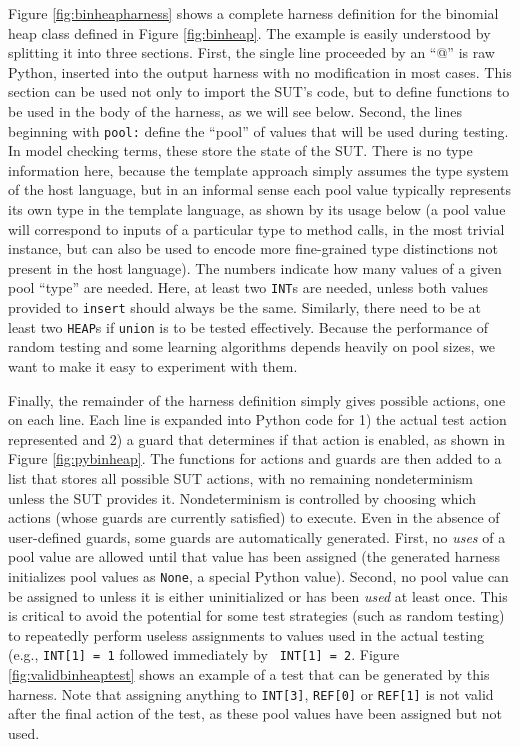 Figure \ref{fig:binheapharness} shows a complete harness definition
for the binomial heap class defined in Figure \ref{fig:binheap}.  The
example is easily understood by splitting it into three sections.
First, the single line proceeded by an ``@'' is raw Python, inserted
into the output harness with no modification in most cases.  This
section can be used not only to import the SUT's code, but to define
functions to be used in the body of the harness, as we will see below.
Second, the lines beginning with {\tt pool:} define the ``pool''
\cite{Pacheco,UDITA,AndrewsTR} of values that will be used during testing.  In
model checking terms, these store the state of the SUT.  There is no
type information here, because the template approach simply assumes
the type system of the host language, but in an informal sense each
pool value typically represents its own type in the template language,
as shown by its usage below (a pool value will correspond to inputs of
a particular type to method calls, in the most trivial instance, but
can also be used to encode more fine-grained type distinctions not
present in the host language).  The numbers indicate how many values
of a given pool ``type'' are needed.  Here, at least two {\tt INT}s
are needed, unless both values provided to {\tt insert} should always
be the same.  Similarly, there need to be at least two {\tt HEAP}s if
{\tt union} is to be tested effectively.  Because the performance of
random testing and some learning algorithms depends heavily on pool
sizes, we want to make it easy to experiment with them.  

Finally, the remainder of the harness definition simply gives possible
actions, one on each line.  Each line is expanded into Python code for
1) the actual test action represented and 2) a guard that determines
if that action is enabled, as shown in Figure \ref{fig:pybinheap}.
The functions for actions and guards are then added to a list that
stores all possible SUT actions, with no remaining nondeterminism
unless the SUT provides it.  Nondeterminism is controlled by choosing
which actions (whose guards are currently satisfied) to execute.  Even in the absence of user-defined guards, some
guards are automatically generated.  First, no \emph{uses} of a pool
value are allowed until that value has been assigned (the generated
harness initializes pool values as {\tt None}, a special Python
value).  Second, no pool value can be assigned to unless it is either
uninitialized or has been \emph{used} at least once.  This is critical
to avoid the potential for some test strategies (such as random
testing) to repeatedly perform useless assignments to values used in
the actual testing (e.g., {\tt INT[1] = 1} followed immediately by {\tt
  INT[1] = 2}.  Figure \ref{fig:validbinheaptest} shows an example of
a test that can be generated by this harness.  Note that assigning
anything to {\tt INT[3]}, {\tt REF[0]} or {\tt REF[1]} is not valid
after the final action of the test, as these pool values have been
assigned but not used.

